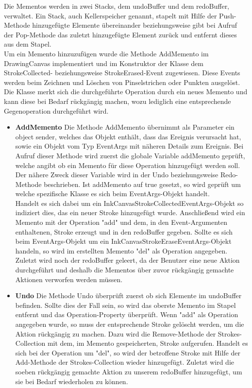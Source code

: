 Die Mementos werden in zwei Stacks, dem undoBuffer und dem redoBuffer, verwaltet. Ein Stack, auch Kellerspeicher genannt, stapelt mit Hilfe der Push-Methode hinzugefügte Elemente übereinander beziehungsweise gibt bei Aufruf der Pop-Methode das zuletzt hinzugefügte Element zurück und entfernt dieses aus dem Stapel.\\
Um ein Memento hinzuzufügen wurde die Methode AddMemento im DrawingCanvas implementiert und im Konstruktor der Klasse dem StrokeCollected- beziehungsweise StrokeErased-Event zugewiesen. Diese Events werden beim Zeichnen und Löschen von Pinselstrichen oder Punkten ausgelöst. Die Klasse merkt sich die durchgeführte Operation durch ein neues Memento und kann diese bei Bedarf rückgängig machen, wozu lediglich eine entsprechende Gegenoperation durchgeführt wird.
\begin{itemize}
\item \textbf{AddMemento}
Die Methode AddMemento übernimmt als Parameter ein object sender, welches das Objekt enthält, dass das Ereignis verursacht hat, sowie ein Objekt vom Typ EventArgs mit näheren Details zum Ereignis. Bei Aufruf dieser Methode wird zuerst die globale Variable addMemento geprüft, welche angibt ob ein Memento für diese Operation hinzugefügt werden soll. Der nähere Zweck dieser Variable wird in der Undo beziehungsweise Redo-Methode beschrieben. Ist addMemento auf true gesetzt, so wird geprüft um welche spezifische Klasse es sich beim EventArgs-Objekt handelt.\\
Handelt es sich dabei um ein InkCanvasStrokeCollectedEventArgs-Objekt so indiziert dies, das ein neuer Stroke hinzugefügt wurde. Anschließend wird ein Memento mit der Operation "add" und dem, in den Event-Argumenten enthaltenen, Stroke erzeugt und in den redoBuffer gegeben. Sollte es sich beim EventArgs-Objekt um ein InkCanvasStrokeEraseEventArgs-Objekt handeln, so wird im erstellten Memento "del" als Operation angegeben. Zuletzt wird noch der redoBuffer geleert, da der Benutzer eine neue Aktion durchgeführt und deshalb die Mementos über zuvor rückgängig gemachte Aktionen verworfen werden müssen.
\item \textbf{Undo}
Die Methode Undo überprüft zuerst ob sich Elemente im undoBuffer befinden. Sollte dies der Fall sein, so wird das oberste Memento im Stapel entfernt und das Operation-Property überprüft. Wenn "add" als Operation angegeben wurde, so muss der entsprechende Stroke gelöscht werden, um die Aktion rückgängig zu machen. Dazu wird die Remove-Methode der Strokes-Collection mit dem, im Memento gespeicherten, Stroke aufgerufen. Handelt es sich bei der Operation um "del", so wird der betroffene Stroke mit Hilfe der Add-Methode der Strokes-Collection wieder hinzugefügt. Zuletzt wird die soeben rückgängig gemachte Aktion zu unserem redoBuffer hinzugefügt, um sie bei Bedarf wiederholen zu können.\\

\end{itemize}
